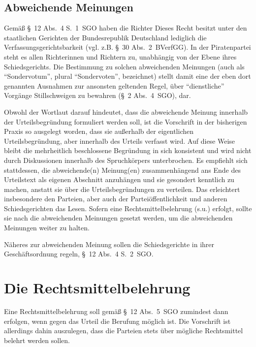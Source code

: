 \subsection{Abweichende Meinungen}
Gemäß \S~12 Abs.~4 S.~1~SGO haben die Richter 
Dieses Recht besitzt unter den staatlichen Gerichten der Bundesrepublik Deutschland lediglich die Verfassungsgerichtsbarkeit (vgl. z.B. \S~30 Abs.~2~BVerfGG).
In der Piratenpartei steht es allen Richterinnen und Richtern zu, unabhängig von der Ebene ihres Schiedsgerichts.
Die Bestimmung zu solchen abweichenden Meinungen (auch als \enquote{Sondervotum}, plural \enquote{Sondervoten}, bezeichnet) stellt damit eine der eben dort genannten Ausnahmen zur ansonsten geltenden Regel, über \enquote{dienstliche} Vorgänge Stillschweigen zu bewahren (\S~2 Abs.~4~SGO), dar.

Obwohl der Wortlaut darauf hindeutet, dass die abweichende Meinung innerhalb der Urteilsbegründung formuliert werden soll, ist die Vorschrift in der bisherigen Praxis so ausgelegt worden, dass sie außerhalb der eigentlichen Urteilsbegründung, aber innerhalb des Urteils verfasst wird.
Auf diese Weise bleibt die mehrheitlich beschlossene Begründung in sich konsistent und wird nicht durch Diskussionen innerhalb des Spruchkörpers unterbrochen.
Es empfiehlt sich stattdessen, die abweichende(n) Meinung(en) zusammenhängend ans Ende des Urteilstext als eigenen Abschnitt anzuhängen und sie gesondert kenntlich zu machen, anstatt sie über die Urteilsbegründungen zu verteilen.
Das erleichtert insbesondere den Parteien, aber auch der Parteiöffentlichkeit und anderen Schiedsgerichten das Lesen.
Sofern eine Rechtsmittelbelehrung (s.u.) erfolgt, sollte sie nach die abweichenden Meinungen gesetzt werden, um die abweichenden Meinungen weiter  zu halten.

Näheres zur abweichenden Meinung sollen die Schiedsgerichte in ihrer Geschäftsordnung regeln, \S~12 Abs.~4 S.~2~SGO.

\section{Die Rechtsmittelbelehrung}
Eine Rechtsmittelbelehrung soll gemäß \S~12 Abs.~5~SGO zumindest dann erfolgen, wenn gegen das Urteil die Berufung möglich ist.
Die Vorschrift ist allerdings dahin auszulegen, dass die Parteien stets über mögliche Rechtsmittel belehrt werden sollen.

